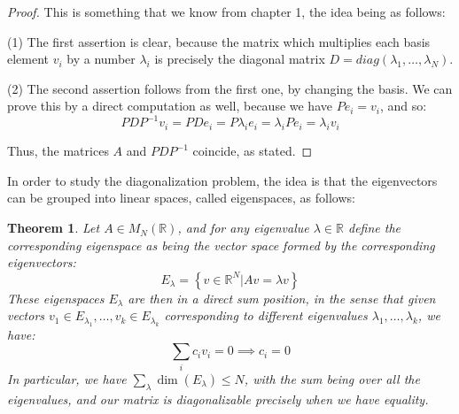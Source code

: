 \documentclass[12pt]{amsbook}
\newtheorem{theorem}{Theorem}[chapter]
\begin{document}
\begin{proof}
This is something that we know from chapter 1, the idea being as follows:

\medskip

(1) The first assertion is clear, because the matrix which multiplies each basis element $v_i$ by a number $\lambda_i$ is precisely the diagonal matrix $D=diag(\lambda_1,\ldots,\lambda_N)$.

\medskip

(2) The second assertion follows from the first one, by changing the basis. We can prove this by a direct computation as well, because we have $Pe_i=v_i$, and so:
$$PDP^{-1}v_i
=PDe_i
=P\lambda_ie_i
=\lambda_iPe_i
=\lambda_iv_i$$

Thus, the matrices $A$ and $PDP^{-1}$ coincide, as stated.
\end{proof}

In order to study the diagonalization problem, the idea is that the eigenvectors can be grouped into linear spaces, called eigenspaces, as follows:


\begin{theorem}
Let $A\in M_N(\mathbb R)$, and for any eigenvalue $\lambda\in\mathbb R$ define the corresponding eigenspace as being the vector space formed by the corresponding eigenvectors:
$$E_\lambda=\left\{v\in\mathbb R^N\Big|Av=\lambda v\right\}$$
These eigenspaces $E_\lambda$ are then in a direct sum position, in the sense that given vectors $v_1\in E_{\lambda_1},\ldots,v_k\in E_{\lambda_k}$ corresponding to different eigenvalues $\lambda_1,\ldots,\lambda_k$, we have:
$$\sum_ic_iv_i=0\implies c_i=0$$
In particular, we have $\sum_\lambda\dim(E_\lambda)\leq N$, with the sum being over all the eigenvalues, and our matrix is diagonalizable precisely when we have equality.
\end{theorem}
\end{document}
